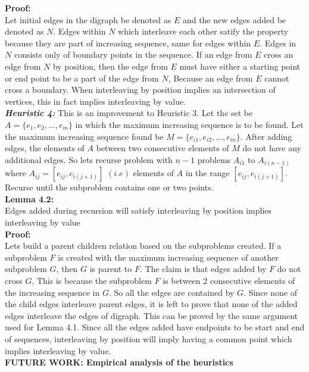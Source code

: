 \documentclass[BTech]{iitmdiss}
\begin{document}
\textbf{Proof:}\\
Let initial edges in the digraph be denoted as $E$ and the new edges added be denoted as $N$. Edges within $N$ which interleave each other satify the property because they are part of increasing sequence, same for edges within $E$. Edges in $N$ consists only of boundary points in the sequence. If an edge from $E$ cross an edge from $N$ by position, then the edge from $E$ must have either a starting point or end point to be a part of the edge from $N$, Because an edge from $E$ cannot cross a boundary. When interleaving by position implies an intersection of vertices, this in fact implies interleaving by value.\\
\textit{\textbf{Heuristic 4:}} This is an improvement to Heuristic 3. Let the set be $A = \{e_1,e_2,...,e_m\}$ in which the maximum increasing sequence is to be found. Let the maximum increasing sequence found be $M = \{e_{i1},e_{i2},...,e_{in}\}$. After adding edges, the elements of $A$ between two consecutive elements of $M$ do not have any additional edges. So lets recurse problem with $n-1$ problems $A_{i1}$ to $A_{i(n-1)}$ where $A_{ij} = [e_{ij},e_{i(j+1)}]$ $(i.e)$ elements of $A$ in the range $[e_{ij},e_{i(j+1)}]$. Recurse until the subproblem contains one or two points.\\
\textbf{Lemma 4.2:}\\ Edges added during recursion will satisfy interleaving by position implies interleaving by value\\
\textbf{Proof:}\\
Lets build a parent children relation based on the subproblems created. If a subproblem $F$ is created with the maximum increasing sequence of another subproblem $G$, then $G$ is parent to $F$. The claim is that edges added by $F$ do not cross $G$, This is because the subproblem $F$ is between 2 consecutive elements of the increasing sequence in $G$. So all the edges are contained by $G$. Since none of the child edges interleave parent edges, it is left to prove that none of the added edges interleave the edges of digraph. This can be proved by the same argument used for Lemma 4.1. Since all the edges added have endpoints to be start and end of sequences, interleaving by position will imply having a common point which implies interleaving by value.\\
\textbf{FUTURE WORK: Empirical analysis of the heuristics} 

\end{document}
